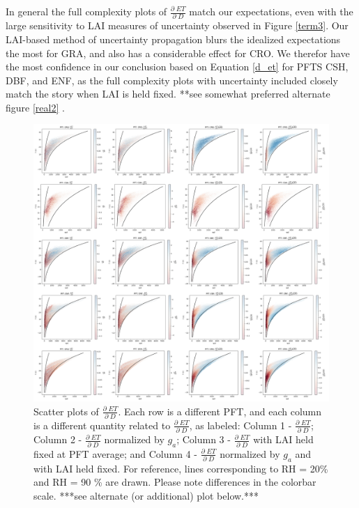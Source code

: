 \documentclass[draft,linenumbers]{agujournal}
\begin{document}
In general the full complexity plots of $\frac{\partial \; ET}{\partial \; D}$ match our expectations, even with the large sensitivity to LAI measures of uncertainty observed in Figure \ref{term3}. Our LAI-based method of uncertainty propagation blurs the idealized expectations the most for GRA, and also has a considerable effect for CRO. We therefor have the most confidence in our conclusion based on Equation \ref{d_et} for PFTS CSH, DBF, and ENF, as the full complexity plots with uncertainty included closely match the story when LAI is held fixed. **see somewhat preferred alternate figure \ref{real2} .
\begin{figure}[h]
\centering
\includegraphics[width=\textwidth]{./fig06.png}
\caption{Scatter plots of $\frac{\partial \; ET}{\partial \; D}$. Each row is a different PFT, and each column is a different quantity related to $\frac{\partial \; ET}{\partial \; D}$, as labeled: Column 1 - $\frac{\partial \; ET}{\partial \; D}$; Column 2 - $\frac{\partial \; ET}{\partial \; D}$ normalized by $g_a$; Column 3 - $\frac{\partial \; ET}{\partial \; D}$ with LAI held fixed at PFT average; and Column 4 - $\frac{\partial \; ET}{\partial \; D}$ normalized by $g_a$ and with LAI held fixed. For reference, lines corresponding to RH = 20\% and RH = 90 \% are drawn. Please note differences in the colorbar scale. ***see alternate (or additional) plot below.***}
\label{real}
\end{figure}
\end{document}
